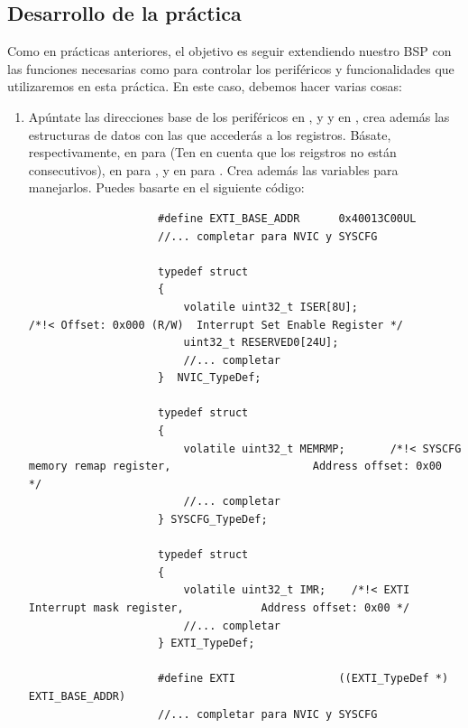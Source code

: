 \documentclass[../main.tex]{subfiles}
\begin{document}
    \subsection{Desarrollo de la práctica}

        Como en prácticas anteriores, el objetivo es seguir extendiendo nuestro BSP con las funciones necesarias como para controlar los periféricos y funcionalidades que utilizaremos en esta práctica. En este caso, debemos hacer varias cosas:

        \begin{enumerate}
            \item Apúntate las direcciones base de los periféricos  en \PMMAN[4.2], y  y  en \REFMAN[1.6.2], crea además las estructuras de datos con las que accederás a los registros. Básate, respectivamente, en \PMMAN[4.2] para  (Ten en cuenta que los reigstros no están consecutivos), en \REFMAN[10.7.7] para , y en \REFMAN[7.2.8] para . Crea además las variables para manejarlos. Puedes basarte en el siguiente código:
            

                \begin{lstlisting}
                    #define EXTI_BASE_ADDR 		0x40013C00UL
                    //... completar para NVIC y SYSCFG

                    typedef struct
                    {
                        volatile uint32_t ISER[8U];               /*!< Offset: 0x000 (R/W)  Interrupt Set Enable Register */
                        uint32_t RESERVED0[24U];
                        //... completar
                    }  NVIC_TypeDef;

                    typedef struct
                    {
                        volatile uint32_t MEMRMP;       /*!< SYSCFG memory remap register,                      Address offset: 0x00      */
                        //... completar
                    } SYSCFG_TypeDef;

                    typedef struct
                    {
                        volatile uint32_t IMR;    /*!< EXTI Interrupt mask register,            Address offset: 0x00 */
                        //... completar
                    } EXTI_TypeDef;

                    #define EXTI                ((EXTI_TypeDef *) EXTI_BASE_ADDR)
                    //... completar para NVIC y SYSCFG
                \end{lstlisting}


\end{enumerate}
\end{document}
